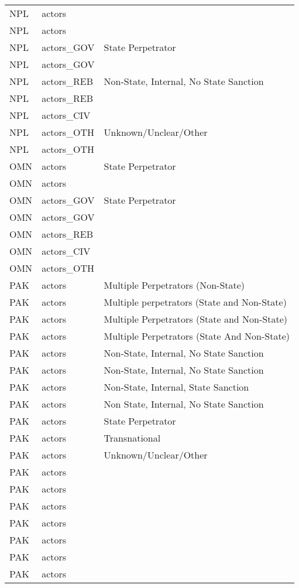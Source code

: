 \begin{table}[ht]
\begin{tabular}{lll}
  NPL & actors &  \\ 
  NPL & actors &  \\ 
  NPL & actors\_GOV & State Perpetrator \\ 
  NPL & actors\_GOV &  \\ 
  NPL & actors\_REB & Non-State, Internal, No State Sanction \\ 
  NPL & actors\_REB &  \\ 
  NPL & actors\_CIV &  \\ 
  NPL & actors\_OTH & Unknown/Unclear/Other \\ 
  NPL & actors\_OTH &  \\ 
  OMN & actors & State Perpetrator \\ 
  OMN & actors &  \\ 
  OMN & actors\_GOV & State Perpetrator \\ 
  OMN & actors\_GOV &  \\ 
  OMN & actors\_REB &  \\ 
  OMN & actors\_CIV &  \\ 
  OMN & actors\_OTH &  \\ 
  PAK & actors & Multiple Perpetrators (Non-State) \\ 
  PAK & actors & Multiple perpetrators (State and Non-State) \\ 
  PAK & actors & Multiple Perpetrators (State and Non-State) \\ 
  PAK & actors & Multiple Perpetrators (State And Non-State) \\ 
  PAK & actors & Non-State, Internal, No State Sanction \\ 
  PAK & actors & Non-State, Internal, No State Sanction \\ 
  PAK & actors & Non-State, Internal, State Sanction \\ 
  PAK & actors & Non State, Internal, No State Sanction \\ 
  PAK & actors & State Perpetrator \\ 
  PAK & actors & Transnational \\ 
  PAK & actors & Unknown/Unclear/Other \\ 
  PAK & actors &  \\ 
  PAK & actors &  \\ 
  PAK & actors &  \\ 
  PAK & actors &  \\ 
  PAK & actors &  \\ 
  PAK & actors &  \\ 
  PAK & actors &  \\ 

\end{tabular}
\end{table}
